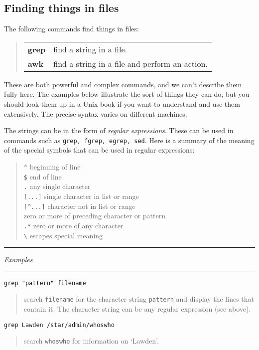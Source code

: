 \documentclass[twoside,11pt]{article}
\newcommand{\example}[2]{\goodbreak
                         {\tt #1}
                         \vspace*{-4mm}
                         \begin{quote}
                           {\small #2}
                         \end{quote}
                        }
\newcommand{\example}[2]{\goodbreak
                            {\tt #1}
                            \vspace*{-4mm}
                            \begin{quote}
                            {#2}
                            \end{quote}
                           }
\newcommand{\exbegin}{\begin{center}
                      \rule{18mm}{0.3mm}
                      {\em Examples}
                      \rule{18mm}{0.3mm}
                      \end{center}
                     }
\begin{document}
\subsection{Finding things in files}

The following commands find things in files:

\begin{quote}
\begin{tabular}{lp{67mm}}

{\bf grep}  & find a string in a file.\\
{\bf awk}   & find a string in a file and perform an action.

\end{tabular}
\end{quote}

These are both powerful and complex commands, and we can't describe them fully
here.
The examples below illustrate the sort of things they can do, but you should
look them up in a Unix book if you want to understand and use them extensively.
The precise syntax varies on different machines.

The strings can be in the form of {\em regular expressions}.
These can be used in commands such as {\tt grep, fgrep, egrep, sed}.
Here is a summary of the meaning of the special symbols that can be used
in regular expressions:
\begin{quote}
\verb+^+ \hfill beginning of line \\
{\tt \$} \hfill end of line \\
{\tt .} \hfill any single character \\
{\tt [...]} \hfill single character in list or range \\
\verb+[^...]+ \hfill character not in list or range \\
{\tt *} \hfill zero or more of preceding character or pattern \\
{\tt .*} \hfill zero or more of any character \\
\verb+\+ \hfill escapes special meaning
\end {quote}

\goodbreak

\exbegin

\example{grep "pattern" filename}
{search {\tt filename} for the character string {\tt pattern} and display the
lines that contain it.
The character string can be any regular expression (see above).}

\example{grep Lawden /star/admin/whoswho}
{search {\tt whoswho} for information on `Lawden'.}
\end{document}
